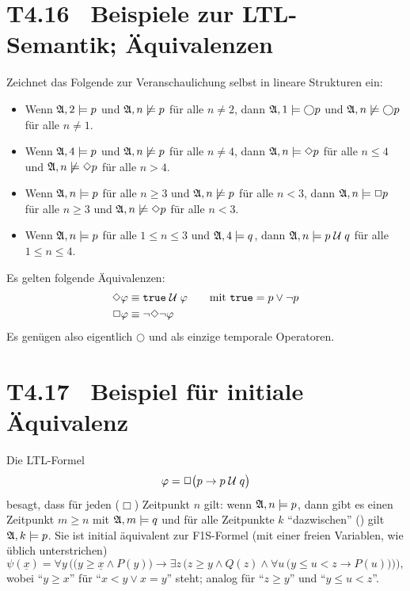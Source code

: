 \documentclass[fontsize=11pt, twoside=false, numbers=autoenddot]{scrbook}
\begin{document}
\section*{T4.16~ Beispiele zur LTL-Semantik; Äquivalenzen}

Zeichnet das Folgende zur Veranschaulichung selbst in lineare Strukturen ein:
\begin{itemize}
  \item
    Wenn $\mathfrak{A},2 \models p$ und $\mathfrak{A},n \not\models p$ für alle $n \neq 2$,
    dann $\mathfrak{A},1 \models \bigcirc p$ und $\mathfrak{A},n \not\models \bigcirc p$ für alle $n \neq 1$.
  \item
    Wenn $\mathfrak{A},4 \models p$ und $\mathfrak{A},n \not\models p$ für alle $n \neq 4$,
    dann $\mathfrak{A},n \models \Diamond p$ für alle $n \leq 4$
    und $\mathfrak{A},n \not\models \Diamond p$ für alle $n > 4$.
  \item
    Wenn $\mathfrak{A},n \models p$ für alle $n \geq 3$ und $\mathfrak{A},n \not\models p$ für alle $n < 3$,
    dann $\mathfrak{A},n \models \Box p$ für alle $n \geq 3$
    und $\mathfrak{A},n \not\models \Diamond p$ für alle $n < 3$.
  \item
    Wenn $\mathfrak{A},n \models p$ für alle $1 \leq n \leq 3$ und $\mathfrak{A},4 \models q$,
    dann $\mathfrak{A},n \models p \mathrel{\mathcal{U}} q$ für alle $1 \leq n \leq 4$.
\end{itemize}
\par\medskip
Es gelten folgende Äquivalenzen:
\begin{align*}
  \Diamond\varphi & \equiv \texttt{true}\mathrel{\mathcal{U}}\varphi\qquad \text{mit \texttt{true}} = p \lor \lnot p \\
  \Box\varphi     & \equiv \lnot\Diamond\lnot\varphi
\end{align*}
Es genügen also eigentlich $\bigcirc$ und \Umc als einzige temporale Operatoren.

\section*{T4.17~ Beispiel für initiale Äquivalenz}

Die LTL-Formel
%
\[
  \varphi = \Box \big(p \to p \mathrel{\mathcal{U}} q\big)
\]
besagt, dass für jeden ($\Box$) Zeitpunkt $n$ gilt:
wenn $\mathfrak{A},n \models p$,
dann gibt es einen Zeitpunkt $m \geq n$ mit
$\mathfrak{A},m \models q$ und für alle Zeitpunkte $k$ "`dazwischen"'
(\Umc) gilt $\mathfrak{A},k \models p$.
Sie ist initial äquivalent zur F1S-Formel
(mit einer freien Variablen, wie üblich unterstrichen)
\[
  \psi(\underline x) = 
  \forall y\,\bigg(
    \big(y \geq \underline x \land P(y)\big) \to
    \exists z\,\Big(
      z \geq y \land Q(z) \land \forall u\,\big(
        y \leq u < z \to P(u)
      \big)
    \Big)
  \bigg),
\]
wobei "`$y \geq x$"' für "`$x < y \lor x = y$"' steht;
analog für "`$z \geq y$"' und "`$y \leq u < z$"'.
\end{document}
